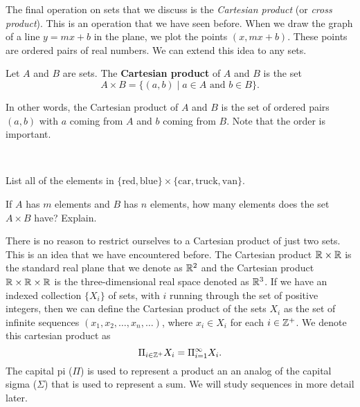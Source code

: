 \label{sec_cart_prod}

The final operation on sets that we discuss is the \emph{Cartesian product} (or \emph{cross product}). This is an operation that we have seen before. When we draw the graph of a line $y = mx+b$ in the plane, we plot the points $(x,mx+b)$. These points are ordered pairs of real numbers. We can extend this idea to any sets. 

\begin{definition} Let $A$ and $B$ are sets. The \textbf{Cartesian product} of $A$ and $B$ is the set 
\[A \times B = \{(a,b) \mid a \in A \text{ and } b \in B\}.\]
\end{definition}

In other words, the Cartesian product of $A$ and $B$ is the set of ordered pairs $(a,b)$ with $a$ coming from $A$ and $b$ coming from $B$. Note that the order is important. 

\begin{activity} ~
	\ba
	\item List all of the elements in $\{\text{red}, \text{blue}\} \times \{\text{car}, \text{truck}, \text{van}\}$. 
	
	\item If $A$ has $m$ elements and $B$ has $n$ elements, how many elements does the set $A \times B$ have? Explain.

	\ea
	
\end{activity}

\begin{comment}

\ActivitySolution

	\ba
	\item The elements are 
	\begin{center} (red,car), (red,truck), (red,van), (blue,car), (blue,truck), (blue,van).\end{center}
	
	\item Any element in $A \times B$ pairs an element of $A$ with an element of $B$. We can choose $n$ elements from $A$ and $m$ from $B$, so the total number of pairings is $nm$. 

	\ea
	

\end{comment}

There is no reason to restrict ourselves to a Cartesian product of just two sets. This is an idea that we have encountered before. The Cartesian product $\mathbb{R} \times \mathbb{R}$ is the standard real plane that we denote as $\mathbb{R}^2$ and the Cartesian product $\mathbb{R} \times \mathbb{R} \times \mathbb{R}$ is the three-dimensional real space denoted as $\mathbb{R}^3$. If we have an indexed collection $\{X_{i}\}$ of sets, with $i$ running through the set of positive integers, then we can define the Cartesian product of the sets $X_{i}$ as the set of infinite sequences $(x_1, x_2, \ldots, x_n, \ldots)$, where $x_i \in X_i$ for each $i \in \mathbb{Z}^+$. We denote this cartesian product as 
\[\Pi_{i \in \mathbb{Z}^+} X_i = \Pi_{i=1}^{\infty} X_i. \]
The capital pi ($\Pi$) is used to represent a product an an analog of the capital sigma ($\Sigma$) that is used to represent a sum. We will study sequences in more detail later. 


